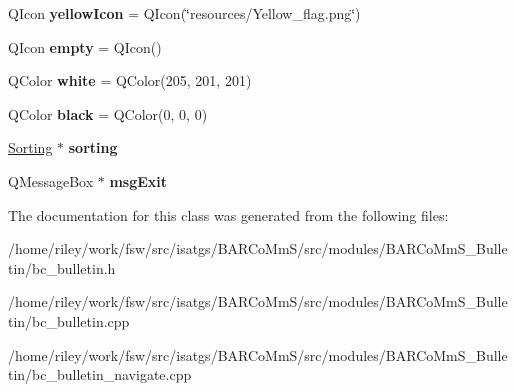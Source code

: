 \begin{DoxyCompactItemize}
\item 
Q\+Icon {\bfseries yellow\+Icon} = Q\+Icon(\char`\"{}resources/Yellow\+\_\+flag.\+png\char`\"{})\hypertarget{class_b_c___bulletin_a27ce7e38f3e0480e27e2c10dd26bfefb}{}\label{class_b_c___bulletin_a27ce7e38f3e0480e27e2c10dd26bfefb}

\item 
Q\+Icon {\bfseries empty} = Q\+Icon()\hypertarget{class_b_c___bulletin_a88fb621b715e82241c3f72e920ecf059}{}\label{class_b_c___bulletin_a88fb621b715e82241c3f72e920ecf059}

\item 
Q\+Color {\bfseries white} = Q\+Color(205, 201, 201)\hypertarget{class_b_c___bulletin_a87ca8b15ff5164f3824b1fabd7f1d9fe}{}\label{class_b_c___bulletin_a87ca8b15ff5164f3824b1fabd7f1d9fe}

\item 
Q\+Color {\bfseries black} = Q\+Color(0, 0, 0)\hypertarget{class_b_c___bulletin_ab658d53d15d189685ca4d69882930721}{}\label{class_b_c___bulletin_ab658d53d15d189685ca4d69882930721}

\item 
\hyperlink{class_sorting}{Sorting} $\ast$ {\bfseries sorting}\hypertarget{class_b_c___bulletin_ac897bd2e08871b5935c934df30a951e9}{}\label{class_b_c___bulletin_ac897bd2e08871b5935c934df30a951e9}

\item 
Q\+Message\+Box $\ast$ {\bfseries msg\+Exit}\hypertarget{class_b_c___bulletin_a0011bd3bb671fa6a41a6da0ce7273b8f}{}\label{class_b_c___bulletin_a0011bd3bb671fa6a41a6da0ce7273b8f}

\end{DoxyCompactItemize}


The documentation for this class was generated from the following files\+:\begin{DoxyCompactItemize}
\item 
/home/riley/work/fsw/src/isatgs/\+B\+A\+R\+Co\+Mm\+S/src/modules/\+B\+A\+R\+Co\+Mm\+S\+\_\+\+Bulletin/bc\+\_\+bulletin.\+h\item 
/home/riley/work/fsw/src/isatgs/\+B\+A\+R\+Co\+Mm\+S/src/modules/\+B\+A\+R\+Co\+Mm\+S\+\_\+\+Bulletin/bc\+\_\+bulletin.\+cpp\item 
/home/riley/work/fsw/src/isatgs/\+B\+A\+R\+Co\+Mm\+S/src/modules/\+B\+A\+R\+Co\+Mm\+S\+\_\+\+Bulletin/bc\+\_\+bulletin\+\_\+navigate.\+cpp\end{DoxyCompactItemize}
